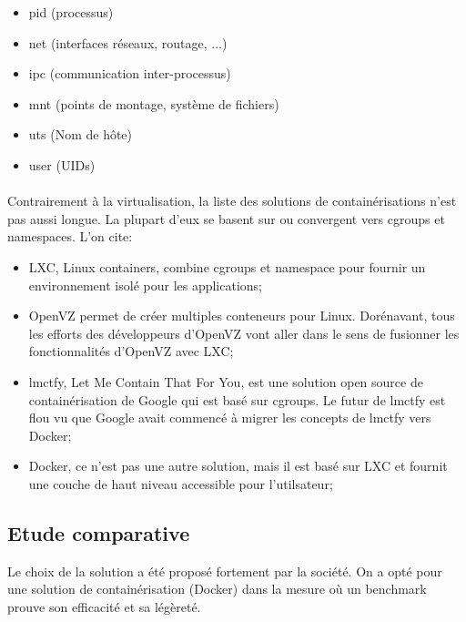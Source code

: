 \begin{onehalfspace}
\begin{itemize}
\begin{itemize}
\item pid (processus)
\item net (interfaces réseaux, routage, ...)
\item ipc (communication inter-processus)
\item mnt (points de montage, système de fichiers)
\item uts (Nom de hôte)
\item user (UIDs)
\end{itemize}

\end{itemize}


\paragraph{}
Contrairement à la virtualisation, la liste des solutions de containérisations n'est pas aussi longue. La plupart d'eux se basent sur ou convergent vers cgroups et namespaces. L'on cite:

\begin{itemize}
\item LXC, Linux containers, combine cgroups et namespace pour fournir un environnement isolé pour les applications;
\item OpenVZ permet de créer multiples conteneurs pour Linux. Dorénavant, tous les efforts des développeurs d'OpenVZ vont aller dans le sens de fusionner les fonctionnalités d'OpenVZ avec LXC;
\item lmctfy, Let Me Contain That For You, est une solution open source de containérisation de Google qui est basé sur cgroups. Le futur de lmctfy est flou vu que Google avait commencé à migrer les concepts de lmctfy vers Docker;
\item Docker, ce n'est pas une autre solution, mais il est basé sur LXC et fournit une couche de haut niveau accessible pour l'utilsateur;

\end{itemize}

\subsection{Etude comparative}

Le choix de la solution a été proposé fortement par la société. On a opté pour une solution de containérisation (Docker) dans la mesure où un benchmark prouve son efficacité et sa légèreté.






\end{onehalfspace}
